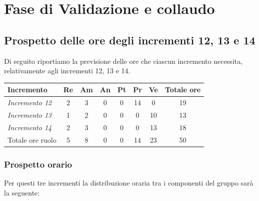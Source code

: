 {{{{{{{{{{{{{{{{{\section{Fase di Validazione e collaudo}\label{PreventivoFaseDiProgettazionediValidazioneECollaudo}

\subsection{Prospetto delle ore degli incrementi 12, 13 e 14}\label{PreventivoFaseDiProgettazionediValidazioneECollaudoIncrementi12-13-14}
Di seguito riportiamo la previsione delle ore che ciascun incremento necessita, relativamente agli incrementi 12, 13 e 14.
\quad
\def\tabularxcolumn#1{m{#1}}
{

	\begin{center}
		\renewcommand{\arraystretch}{1.4}
		\begin{tabularx}{\textwidth}{|X|c|c|c|c|c|c|c|}
			\hline
			\rowcolor{airforceblue}
			\textbf{Incremento} & \textbf{Re} & \textbf{Am} & \textbf{An} & \textbf{Pt} & \textbf{Pr} & \textbf{Ve} & \textbf{Totale ore}\\
			\hline
			\textit{Incremento 12} & 2 & 3 & 0 & 0 & 14 & 0 & 19\\
			\hline
			\textit{Incremento 13} & 1 & 2 & 0 & 0 & 0 & 10 & 13\\
			\hline
			\textit{Incremento 14} & 2 & 3 & 0 & 0 & 0 & 13 & 18\\
			\hline
			Totale ore ruolo & 5 & 8 & 0 & 0 & 14 & 23 & 50\\
			\hline
		\end{tabularx}
	\end{center}

\subsubsection{Prospetto orario}\label{PreventivoFaseDiProgettazionediValidazioneECollaudoIncrementi12-13-14ProspettoOrario}
Per questi tre incrementi la distribuzione oraria tra i componenti del gruppo sarà la seguente:

}}}}}}}}}}}}}}}}}}
